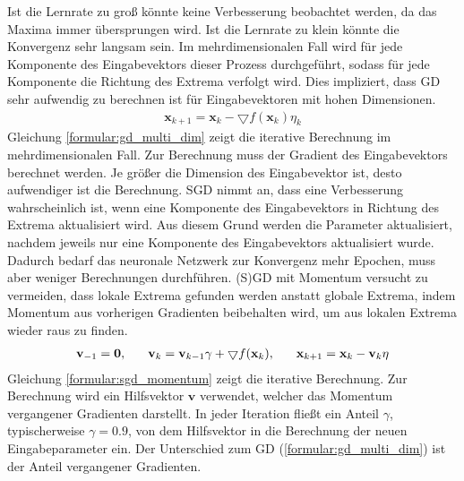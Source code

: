Ist die Lernrate zu groß könnte keine Verbesserung beobachtet werden, da das Maxima immer übersprungen wird.
Ist die Lernrate zu klein könnte die Konvergenz sehr langsam sein.
Im mehrdimensionalen Fall wird für jede Komponente des Eingabevektors dieser Prozess durchgeführt, sodass für jede Komponente
die Richtung des Extrema verfolgt wird.
Dies impliziert, dass GD sehr aufwendig zu berechnen ist für Eingabevektoren mit hohen Dimensionen.
\begin{align}
    \label{formular:gd_multi_dim}
    \textbf{x}_{k+1} = \textbf{x}_k - \bigtriangledown f(\textbf{x}_k)\eta_k
\end{align}
Gleichung \ref{formular:gd_multi_dim} zeigt die iterative Berechnung im mehrdimensionalen Fall.
Zur Berechnung muss der Gradient des Eingabevektors berechnet werden.
Je größer die Dimension des Eingabevektor ist, desto aufwendiger ist die Berechnung.
\newline
\newline
SGD nimmt an, dass eine Verbesserung wahrscheinlich ist, wenn eine Komponente des Eingabevektors in Richtung des Extrema aktualisiert wird.
Aus diesem Grund werden die Parameter aktualisiert, nachdem jeweils nur eine Komponente des Eingabevektors aktualisiert wurde.
Dadurch bedarf das neuronale Netzwerk zur Konvergenz mehr Epochen, muss aber weniger Berechnungen durchführen.
\newline
\newline
(S)GD mit Momentum versucht zu vermeiden, dass lokale Extrema gefunden werden anstatt globale Extrema, indem Momentum aus
vorherigen Gradienten beibehalten wird, um aus lokalen Extrema wieder raus zu finden.
\begin{align}
    \label{formular:sgd_momentum}
    \textbf{v}_{-1} = \textbf{0}, \hspace{0.6cm} \textbf{v}_k = \textbf{v}_{k-1}\gamma +
    \bigtriangledown f(\textbf{x}_k), \hspace{0.6cm} \textbf{x}_{k+1} = \textbf{x}_k - \textbf{v}_k\eta
\end{align}
Gleichung \ref{formular:sgd_momentum} zeigt die iterative Berechnung.
Zur Berechnung wird ein Hilfsvektor $\textbf{v}$ verwendet, welcher das Momentum vergangener Gradienten darstellt.
In jeder Iteration fließt ein Anteil $\gamma$, typischerweise $\gamma=0.9$, von dem Hilfsvektor in die Berechnung der neuen Eingabeparameter ein.
Der Unterschied zum GD (\ref{formular:gd_multi_dim}) ist der Anteil vergangener Gradienten.
\newline
\newline
